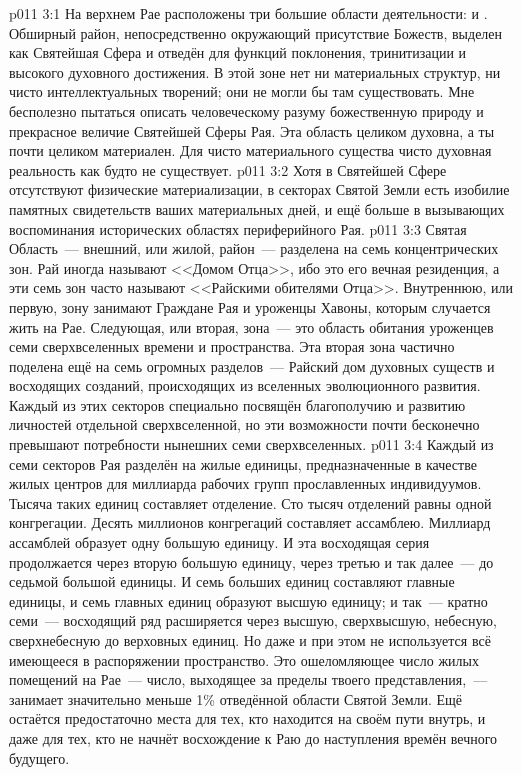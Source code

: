 \vs p011 3:1 На верхнем Рае расположены три большие области деятельности:   и . Обширный район, непосредственно окружающий присутствие Божеств, выделен как Святейшая Сфера и отведён для функций поклонения, тринитизации и высокого духовного достижения. В этой зоне нет ни материальных структур, ни чисто интеллектуальных творений; они не могли бы там существовать. Мне бесполезно пытаться описать человеческому разуму божественную природу и прекрасное величие Святейшей Сферы Рая. Эта область целиком духовна, а ты почти целиком материален. Для чисто материального существа чисто духовная реальность как будто не существует.
\vs p011 3:2 Хотя в Святейшей Сфере отсутствуют физические материализации, в секторах Святой Земли есть изобилие памятных свидетельств ваших материальных дней, и ещё больше в вызывающих воспоминания исторических областях периферийного Рая.
\vs p011 3:3 Святая Область~--- внешний, или жилой, район~--- разделена на семь концентрических зон. Рай иногда называют <<Домом Отца>>, ибо это его вечная резиденция, а эти семь зон часто называют <<Райскими обителями Отца>>. Внутреннюю, или первую, зону занимают Граждане Рая и уроженцы Хавоны, которым случается жить на Рае. Следующая, или вторая, зона~--- это область обитания уроженцев семи сверхвселенных времени и пространства. Эта вторая зона частично поделена ещё на семь огромных разделов~--- Райский дом духовных существ и восходящих созданий, происходящих из вселенных эволюционного развития. Каждый из этих секторов специально посвящён благополучию и развитию личностей отдельной сверхвселенной, но эти возможности почти бесконечно превышают потребности нынешних семи сверхвселенных.
\vs p011 3:4 Каждый из семи секторов Рая разделён на жилые единицы, предназначенные в качестве жилых центров для миллиарда рабочих групп прославленных индивидуумов. Тысяча таких единиц составляет отделение. Сто тысяч отделений равны одной конгрегации. Десять миллионов конгрегаций составляет ассамблею. Миллиард ассамблей образует одну большую единицу. И эта восходящая серия продолжается через вторую большую единицу, через третью и так далее~--- до седьмой большой единицы. И семь больших единиц составляют главные единицы, и семь главных единиц образуют высшую единицу; и так~--- кратно семи~--- восходящий ряд расширяется через высшую, сверхвысшую, небесную, сверхнебесную до верховных единиц. Но даже и при этом не используется всё имеющееся в распоряжении пространство. Это ошеломляющее число жилых помещений на Рае~--- число, выходящее за пределы твоего представления,~--- занимает значительно меньше 1\% отведённой области Святой Земли. Ещё остаётся предостаточно места для тех, кто находится на своём пути внутрь, и даже для тех, кто не начнёт восхождение к Раю до наступления времён вечного будущего.
